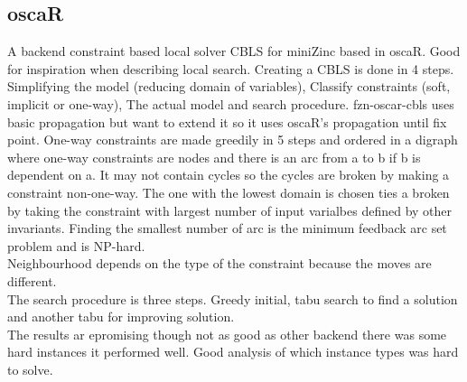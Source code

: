 \documentclass[a4paper,10pt]{article}
\begin{document}
\subsection{oscaR}
A backend constraint based local solver CBLS for miniZinc based in oscaR. Good for inspiration when describing local 
search. Creating a CBLS is done in 4 steps. Simplifying the model (reducing domain of variables), Classify constraints 
(soft, implicit or one-way), The actual model and search procedure. fzn-oscar-cbls uses basic propagation but want to 
extend it so it uses oscaR's propagation until fix point. One-way constraints are made greedily in 5 steps and ordered 
in a digraph where one-way constraints are nodes and there is an arc from a to b if b is dependent on a. It may not 
contain cycles so the cycles are broken by making a constraint non-one-way. The one with the lowest domain is chosen 
ties a broken by taking the constraint with largest number of input varialbes defined by other invariants. Finding the 
smallest number of arc is the minimum feedback arc set problem and is NP-hard. \\ 
Neighbourhood depends on the type of the constraint because the moves are different. \\ 
The search procedure is three steps. Greedy initial, tabu search to find a solution and another tabu for improving 
solution. \\
The results ar epromising though not as good as other backend there was some hard instances it performed well. Good 
analysis of which instance types was hard to solve. 
\end{document}
